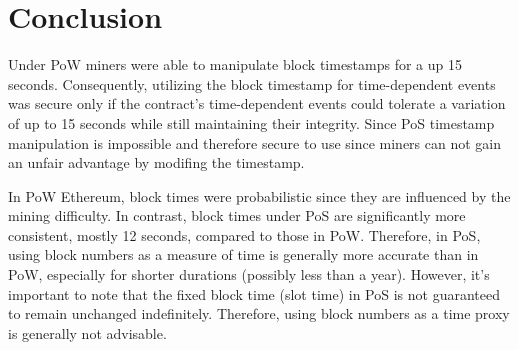 \section{Conclusion}

Under PoW miners were able to manipulate block timestamps for a up 15 seconds.
Consequently, utilizing the block timestamp for time-dependent events was
secure only if the contract's time-dependent events could tolerate a variation
of up to 15 seconds while still maintaining their integrity. Since PoS
timestamp manipulation is impossible and therefore secure to use since miners
can not gain an unfair advantage by modifing the timestamp.

In PoW Ethereum, block times were probabilistic since they are influenced by
the mining difficulty. In contrast, block times under PoS are significantly more
consistent, mostly 12 seconds, compared to those in PoW. Therefore, in PoS,
using block numbers as a measure of time is generally more accurate than in
PoW, especially for shorter durations (possibly less than a year). However,
it's important to note that the fixed block time (slot time) in PoS is not
guaranteed to remain unchanged indefinitely. Therefore, using block numbers as
a time proxy is generally not advisable.


%

